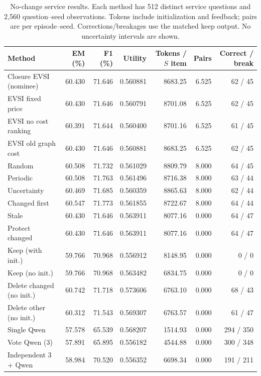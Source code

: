 \begin{table}[t]
\centering\small
\begin{tabular}{lrrrrrr}
\toprule
Method & EM (\%) & F1 (\%) & Utility & Tokens / $S$ item & Pairs & Correct / break \\
\midrule
Closure EVSI (nominee) & 60.430 & 71.646 & 0.560881 & 8683.25 & 6.525 & 62 / 45 \\
EVSI fixed price & 60.430 & 71.646 & 0.560791 & 8701.08 & 6.525 & 62 / 45 \\
EVSI no cost ranking & 60.391 & 71.644 & 0.560400 & 8701.16 & 6.525 & 61 / 45 \\
EVSI old graph cost & 60.430 & 71.646 & 0.560881 & 8683.25 & 6.525 & 62 / 45 \\
Random & 60.508 & 71.732 & 0.561029 & 8809.79 & 8.000 & 64 / 45 \\
Periodic & 60.508 & 71.763 & 0.561496 & 8716.38 & 8.000 & 63 / 44 \\
Uncertainty & 60.469 & 71.685 & 0.560359 & 8865.63 & 8.000 & 62 / 44 \\
Changed first & 60.547 & 71.773 & 0.561855 & 8722.67 & 8.000 & 64 / 44 \\
Stale & 60.430 & 71.646 & 0.563911 & 8077.16 & 0.000 & 64 / 47 \\
Protect changed & 60.430 & 71.646 & 0.563911 & 8077.16 & 0.000 & 64 / 47 \\
Keep (with init.) & 59.766 & 70.968 & 0.556912 & 8148.95 & 0.000 & 0 / 0 \\
Keep (no init.) & 59.766 & 70.968 & 0.563482 & 6834.75 & 0.000 & 0 / 0 \\
Delete changed (no init.) & 60.742 & 71.718 & 0.573606 & 6763.10 & 0.000 & 68 / 43 \\
Delete other (no init.) & 60.312 & 71.543 & 0.569307 & 6763.57 & 0.000 & 61 / 47 \\
Single Qwen & 57.578 & 65.539 & 0.568207 & 1514.93 & 0.000 & 294 / 350 \\
Vote Qwen (3) & 57.891 & 65.895 & 0.556182 & 4544.88 & 0.000 & 300 / 348 \\
Independent 3 + Qwen & 58.984 & 70.520 & 0.556352 & 6698.34 & 0.000 & 191 / 211 \\
\bottomrule
\end{tabular}
\caption{No-change service results. Each method has 512 distinct service questions and 2,560 question--seed observations. Tokens include initialization and feedback; pairs are per episode--seed. Corrections/breakages use the matched keep output. No uncertainty intervals are shown.}
\label{tab:no_change}
\end{table}
